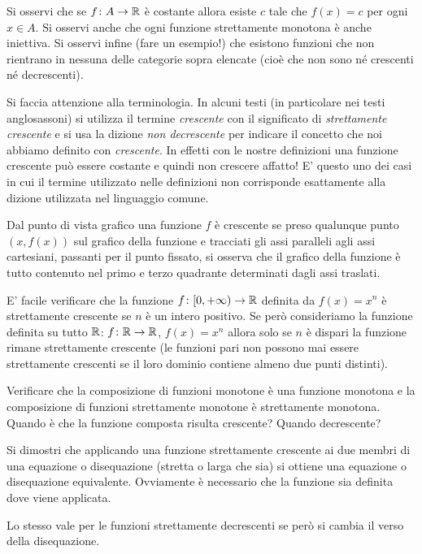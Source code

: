 Si osservi che se $f\colon A \to \mathbb R$ è costante allora esiste $c$ tale che
$f(x)=c$ per ogni $x\in A$. Si osservi anche che ogni funzione strettamente monotona è anche iniettiva. Si osservi infine (fare un esempio!) che esistono funzioni che non rientrano in nessuna delle categorie sopra elencate (cioè che non sono né crescenti né decrescenti).

Si faccia attenzione alla terminologia.
In alcuni testi (in particolare nei testi anglosassoni) si utilizza il termine
\emph{crescente} con il significato di \emph{strettamente crescente} e si usa la dizione \emph{non decrescente} per indicare il concetto che noi abbiamo definito con \emph{crescente}. In
effetti con le nostre definizioni una funzione crescente può essere costante
e quindi non crescere affatto!
E' questo uno dei casi in cui il termine utilizzato nelle definizioni non corrisponde esattamente alla dizione utilizzata
nel linguaggio comune.

Dal punto di vista grafico una funzione $f$ è crescente
se preso qualunque punto $(x,f(x))$ sul grafico della funzione
e tracciati gli assi paralleli agli assi cartesiani, passanti
per il punto fissato, si osserva che il grafico della funzione
è tutto contenuto nel primo e terzo quadrante determinati
dagli assi traslati.

E' facile verificare che la funzione $f\colon [0,+\infty)\to \mathbb R$
definita da $f(x)=x^n$
è strettamente crescente se $n$ è un intero positivo.
Se però consideriamo la funzione definita su tutto
$\mathbb R$: $f\colon \mathbb R \to \mathbb R$,
$f(x)=x^n$ allora solo se $n$ è dispari la funzione rimane
strettamente crescente
(le funzioni pari non possono mai essere strettamente crescenti se
il loro dominio contiene almeno due punti distinti).

\begin{exercise}
Verificare che la composizione di funzioni monotone è una
funzione monotona e la composizione di funzioni strettamente
monotone è strettamente monotona.
Quando è che la funzione composta risulta crescente?
Quando decrescente?
\end{exercise}

\begin{exercise}
Si dimostri che applicando una funzione strettamente crescente ai due
membri di una equazione o disequazione (stretta o larga che sia)
si ottiene una equazione o disequazione equivalente.
Ovviamente è necessario che la funzione sia definita dove viene applicata.

Lo stesso vale per le funzioni strettamente decrescenti se però si cambia il verso della disequazione.
\end{exercise}

